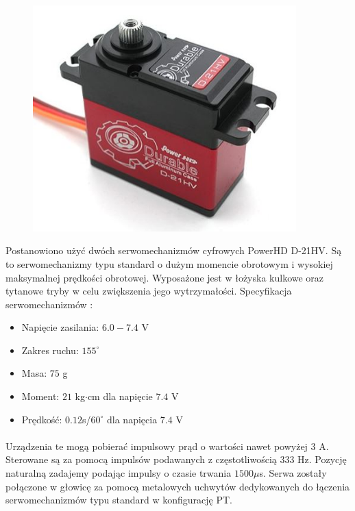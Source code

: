 \paragraph*{}

\begin{figure}[H]
	\centering
	\includegraphics[width=4in]{Pololu.jpg}
\end{figure}

Postanowiono użyć dwóch serwomechanizmów cyfrowych PowerHD D-21HV. Są to serwomechanizmy typu standard o dużym momencie obrotowym i wysokiej maksymalnej prędkości obrotowej. Wyposażone jest w łożyska kulkowe oraz tytanowe tryby w celu zwiększenia jego wytrzymałości. Specyfikacja serwomechanizmów \cite{Pololu}:
\begin{itemize}
\item Napięcie zasilania: \(6.0-7.4\) V
\item Zakres ruchu: \(155^\circ\)
\item Masa: \(75\) g
\item Moment: \(21\) kg\(\cdot\)cm dla napięcie \(7.4\) V
\item Prędkość: \(0.12\)s/\(60^\circ\) dla napięcia \(7.4\) V
\end{itemize}
\paragraph*{}
Urządzenia te mogą pobierać impulsowy prąd o wartości nawet powyżej 3 A. Sterowane są za pomocą impulsów podawanych z częstotliwością 333 Hz. Pozycję naturalną zadajemy podając impulsy o czasie trwania \(1500 \mu\)s. Serwa zostały połączone w głowicę za pomocą metalowych uchwytów dedykowanych do łączenia serwomechanizmów typu standard w konfigurację PT.

